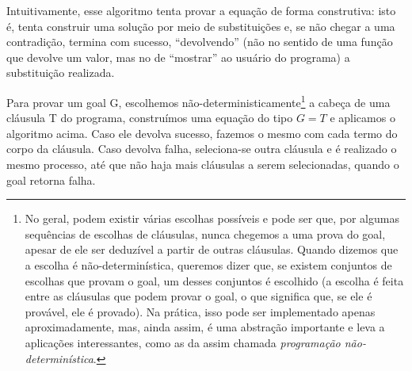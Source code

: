 \documentclass{article}
\theoremstyle{remark}
\theoremstyle{theorem}
\begin{document}

Intuitivamente, esse algoritmo tenta provar a equação de forma construtiva: isto é, tenta construir uma solução por meio de substituições e, se não chegar a uma contradição, termina com sucesso, ``devolvendo'' (não no sentido de uma função que devolve um valor, mas no de ``mostrar'' ao usuário do programa) a substituição realizada.

Para provar um goal G, escolhemos não-deterministicamente\footnote{No geral, podem existir várias escolhas possíveis e pode ser que, por algumas sequências de escolhas de cláusulas, nunca chegemos a uma prova do goal, apesar de ele ser deduzível a partir de outras cláusulas. Quando dizemos que a escolha é não-determinística, queremos dizer que, se existem conjuntos de escolhas que provam o goal, um desses conjuntos é escolhido (a escolha é feita entre as cláusulas que podem provar o
  goal, o que significa que, se ele é provável, ele é provado). Na prática, isso pode ser implementado apenas aproximadamente, mas, ainda assim, é uma abstração importante e leva a aplicações interessantes, como as da assim chamada \textit{programação não-determinística}.} a cabeça de uma cláusula T do programa, construímos uma equação do tipo $G = T$ e aplicamos o algoritmo acima. Caso ele devolva sucesso, fazemos o mesmo com cada termo do corpo da cláusula. Caso devolva falha, seleciona-se outra cláusula e é realizado o mesmo processo, até que não haja mais cláusulas a serem selecionadas, quando o goal retorna falha.
\end{document}
